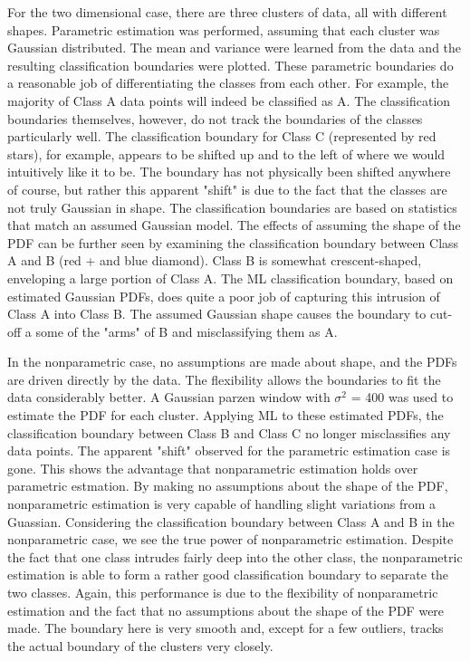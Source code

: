 For the two dimensional case, there are three clusters of data, all with different shapes.  Parametric estimation was performed, assuming that each cluster was Gaussian distributed.  The mean and variance were learned from the data and the resulting classification boundaries were plotted.  These parametric boundaries do a reasonable job of differentiating the classes from each other.  For example, the majority of Class A data points will indeed be classified as A.  The classification boundaries themselves, however, do not track the boundaries of the classes particularly well. The classification boundary for Class C (represented by red stars), for example, appears to be shifted up and to the left of where we would intuitively like it to be.  The boundary has not physically been shifted anywhere of course, but rather this apparent "shift" is due to the fact that the classes are not truly Gaussian in shape.  The classification boundaries are based on statistics that match an assumed Gaussian model.  The effects of assuming the shape of the PDF can be further seen by examining the classification boundary between Class A and B (red + and blue diamond).  Class B is somewhat crescent-shaped, enveloping a large portion of Class A.  The ML classification boundary, based on estimated Gaussian PDFs, does quite a poor job of capturing this intrusion of Class A into Class B.  The assumed Gaussian shape causes the boundary to cut-off a some of the "arms" of B and misclassifying them as A.  

In the nonparametric case, no assumptions are made about shape, and the PDFs are driven directly by the data.  The flexibility allows the boundaries to fit the data considerably better.  A Gaussian parzen window with $\sigma^2$ = 400 was used to estimate the PDF for each cluster.  Applying ML to these estimated PDFs, the classification boundary between Class B and Class C no longer misclassifies any data points.  The apparent "shift" observed for the parametric estimation case is gone.  This shows the advantage that nonparametric estimation holds over parametric estmation.  By making no assumptions about the shape of the PDF, nonparametric estimation is very capable of handling slight variations from a Guassian.  Considering the classification boundary between Class A and B in the nonparametric case, we see the true power of nonparametric estimation.  Despite the fact that one class intrudes fairly deep into the other class, the nonparametric estimation is able to form a rather good classification boundary to separate the two classes.  Again, this performance is due to the flexibility of nonparametric estimation and the fact that no assumptions about the shape of the PDF were made.  The boundary here is very smooth and, except for a few outliers, tracks the actual boundary of the clusters very closely.

